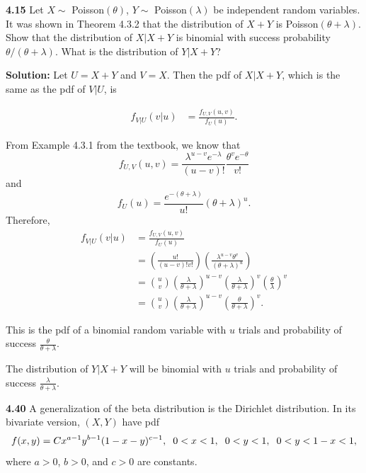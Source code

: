 \documentclass{article}
\newcommand{\mybox}{%
    \collectbox{%
        \setlength{\fboxsep}{1pt}%
        \fbox{\BOXCONTENT}%
    }%
}
\begin{document}
\pagebreak

\noindent\mybox{\textbf{4.15}}  Let $X\sim$ Poisson$(\theta)$, $Y \sim$ Poisson$(\lambda)$ be independent random variables.  It was shown in Theorem 4.3.2 that the distribution of $X+Y$ is Poisson$(\theta + \lambda)$.  Show that the distribution of $X|X+Y$ is binomial with success probability $\theta/(\theta + \lambda)$.  What is the distribution of $Y|X+Y$?

\vspace{3mm}

\noindent\mybox{\textbf{Solution:}}  Let $U=X+Y$ and $V=X$.  Then the pdf of $X|X+Y$, which is the same as the pdf of $V|U$, is

\begin{align}
f_{V|U}(v|u) &= \frac{f_{U,V}(u,v)}{f_U(u)}.
\end{align}

\noindent From Example 4.3.1 from the textbook, we know that $$f_{U,V}(u,v) = \frac{\lambda^{u-v}e^{-\lambda}}{(u-v)!}\frac{\theta^v e^{-\theta}}{v!}$$ and $$f_U(u) = \frac{e^{-(\theta + \lambda)}}{u!}(\theta + \lambda)^u.$$  Therefore, 
\begin{align}
f_{V|U}(v|u) &= \frac{f_{U,V}(u,v)}{f_U(u)} \\
&= \left(\frac{u!}{(u-v)!v!}\right)\left(\frac{\lambda^{u-v}\theta^v}{(\theta + \lambda)^u}\right) \\
&= {u \choose v} \left(\frac{\lambda}{\theta + \lambda}\right)^{u-v}\left(\frac{\lambda}{\theta+\lambda}\right)^v\left(\frac{\theta}{\lambda}\right)^v \\
&= {u \choose v} \left(\frac{\lambda}{\theta + \lambda}\right)^{u-v}\left(\frac{\theta}{\theta + \lambda}\right)^v.
\end{align}

\noindent This is the pdf of a binomial random variable with $u$ trials and probability of success $\frac{\theta}{\theta + \lambda}$.  

\vspace{3mm}

\noindent The distribution of $Y|X+Y$ will be binomial with $u$ trials and probability of success $\frac{\lambda}{\theta + \lambda}$.  

\pagebreak
\noindent\mybox{\textbf{4.40}}  A generalization of the beta distribution is the Dirichlet distribution.  In its bivariate version, $(X,Y)$ have pdf $$f(x,y) = Cx^{a - 1}y^{b - 1}(1-x-y)^{c-1}, \hspace{2mm} 0<x<1, \hspace{2mm} 0<y<1, \hspace{2mm} 0 < y < 1 - x< 1,$$ where $a>0$, $b>0$, and $c>0$ are constants.  
\end{document}
